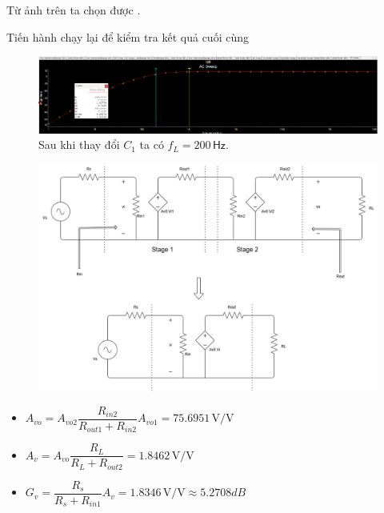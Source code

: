 Từ ảnh trên ta chọn được .

Tiến hành chạy lại để kiểm tra kết quả cuối cùng

\begin{figure}[H]
	\centering
	\includegraphics[width=\linewidth]{./my-chapters/my-images/Question5/c_final.png}
	\caption{Sau khi thay đổi $C_{1}$ ta có $f_{L} = 200\,\textsf{Hz}$.}
\end{figure}


\begin{figure}[H]
	\centering
	\includegraphics[width=.9\linewidth]{./my-chapters/my-diagrams/Question5/cauc_all_stage.png}
\end{figure}

\begin{itemize}[label=+, leftmargin=2cm]
	\item $A_{vo} = A_{vo2}\dfrac{R_{in2}}{R_{out1} + R_{in2}} A_{vo1} = 75.6951\,\text{V/V}$
	\item $A_{v} = A_{vo} \dfrac{R_{L}}{R_{L} + R_{out2}} = 1.8462\,\text{V/V}$
	\item $G_{v} = \dfrac{R_{s}}{R_{s} + R_{in1}}A_{v} = 1.8346\,\text{V/V} \approx 5.2708dB$
\end{itemize}

